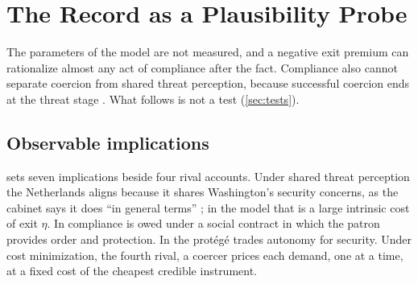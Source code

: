 \section{The Record as a Plausibility Probe}\label{sec:evidence}

The parameters of the model are not measured, and a negative exit premium can rationalize almost any act of compliance after the fact. Compliance also cannot separate coercion from shared threat perception, because successful coercion ends at the threat stage \citep{drezner2003hidden}. What follows is not a test (\cref{sec:tests}).

\subsection{Observable implications}\label{sec:predictions}

 sets seven implications beside four rival accounts. Under shared threat perception the Netherlands aligns because it shares Washington's security concerns, as the cabinet says it does ``in general terms'' \citep[our translation]{tk2026match}; in the model that is a large intrinsic cost of exit $\eta$. In \citet{lake2009hierarchy} compliance is owed under a social contract in which the patron provides order and protection. In \citet{morrow1991alliances} the protégé trades autonomy for security. Under cost minimization, the fourth rival, a coercer prices each demand, one at a time, at a fixed cost of the cheapest credible instrument.

